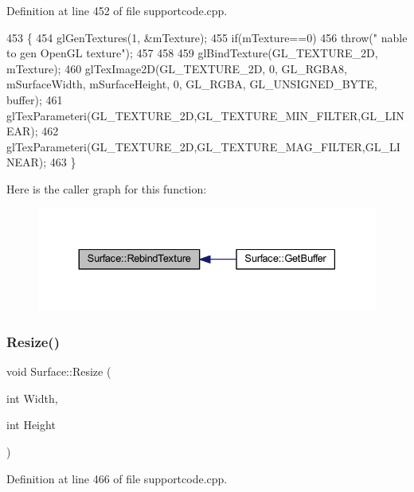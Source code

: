 Definition at line 452 of file supportcode.\+cpp.


\begin{DoxyCode}
453 \{
454     glGenTextures(1, &mTexture);
455     \textcolor{keywordflow}{if}(mTexture==0)
456         \textcolor{keywordflow}{throw}(\textcolor{stringliteral}{" nable to gen OpenGL texture"});
457 
458 
459     glBindTexture(GL\_TEXTURE\_2D, mTexture);
460     glTexImage2D(GL\_TEXTURE\_2D, 0, GL\_RGBA8, mSurfaceWidth, mSurfaceHeight, 0, GL\_RGBA, GL\_UNSIGNED\_BYTE, 
      buffer);
461     glTexParameteri(GL\_TEXTURE\_2D,GL\_TEXTURE\_MIN\_FILTER,GL\_LINEAR);
462     glTexParameteri(GL\_TEXTURE\_2D,GL\_TEXTURE\_MAG\_FILTER,GL\_LINEAR);
463 \}
\end{DoxyCode}
Here is the caller graph for this function\+:
\nopagebreak
\begin{figure}[H]
\begin{center}
\leavevmode
\includegraphics[width=330pt]{class_surface_aa75c49f53fec5c49ba8422c0d64815e6_icgraph}
\end{center}
\end{figure}
\mbox{\label{class_surface_a5e45e936e3057fa1ddad0c7924767005}} 
\subsubsection{\texorpdfstring{Resize()}{Resize()}}
{\footnotesize\ttfamily void Surface\+::\+Resize (\begin{DoxyParamCaption}\item[{int}]{Width,  }\item[{int}]{Height }\end{DoxyParamCaption})}



Definition at line 466 of file supportcode.\+cpp.


